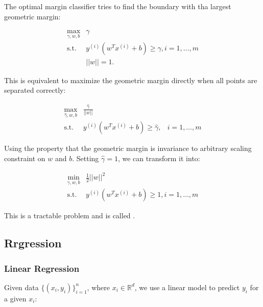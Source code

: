 \documentclass[10pt]{report}
\begin{document}
The optimal margin classifier tries to find the boundary with tha largest geometric margin:

\begin{equation}
    \begin{aligned}
        \max_{\gamma,w,b}&\gamma\\
        \mathrm{s.t.}&y^{(i)}(w^Tx^{(i)}+b)\geq\gamma, i=1,\ldots,m\\
        &||w||=1.
    \end{aligned}
\end{equation}

This is equivalent to maximize the geometric margin directly when all points are separated correctly:

\begin{equation}
    \begin{aligned}
        \max_{\hat{\gamma},w,b}&\frac{\hat{\gamma}}{||w||}\\
        \mathrm{s.t.}&y^{(i)}(w^Tx^{(i)}+b)\geq\hat{\gamma},&i=1,\ldots,m
    \end{aligned}
\end{equation}

Using the property that the geometric margin is invariance to arbitrary scaling constraint on $w$ and $b$. Setting $\hat{\gamma}=1$, we can transform it into:

\begin{equation}
    \begin{aligned}
        \min_{\gamma,w,b}&\frac{1}{2}||w||^{2}\\
        \mathrm{s.t.}&y^{(i)}(w^Tx^{(i)}+b)\geq1, i=1,\ldots,m
    \end{aligned}
\end{equation}

This is a tractable problem and is called .

\subsection{Rrgression}

\subsubsection{Linear Regression}

Given data $\{(x_i,y_i)\}_{i=1}^n$, where $x_i\in\mathbb{R}^d$, we use a linear model to predict $y_i$ for a given $x_i$:

\end{document}
